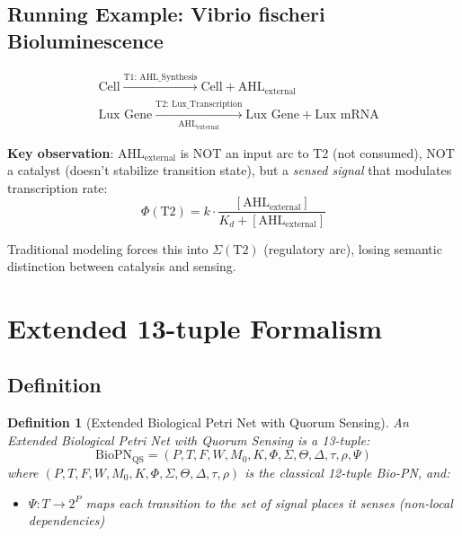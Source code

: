 \documentclass[11pt]{article}
\newtheorem{definition}{Definition}
\begin{document}
\subsection{Running Example: Vibrio fischeri Bioluminescence}

\begin{equation}
\begin{aligned}
&\text{Cell} \xrightarrow{\text{T1: AHL\_Synthesis}} \text{Cell} + \text{AHL}_{\text{external}} \\
&\text{Lux Gene} \xrightarrow[\text{AHL}_{\text{external}}]{\text{T2: Lux\_Transcription}} \text{Lux Gene} + \text{Lux mRNA}
\end{aligned}
\end{equation}

\textbf{Key observation}: $\text{AHL}_{\text{external}}$ is NOT an input arc to T2 (not consumed), NOT a catalyst (doesn't stabilize transition state), but a \emph{sensed signal} that modulates transcription rate:
\begin{equation}
\Phi(\text{T2}) = k \cdot \frac{[\text{AHL}_{\text{external}}]}{K_d + [\text{AHL}_{\text{external}}]}
\end{equation}

Traditional modeling forces this into $\Sigma(\text{T2})$ (regulatory arc), losing semantic distinction between catalysis and sensing.

\section{Extended 13-tuple Formalism}

\subsection{Definition}

\begin{definition}[Extended Biological Petri Net with Quorum Sensing]
An \emph{Extended Biological Petri Net with Quorum Sensing} is a 13-tuple:
\begin{equation}
\text{BioPN}_{\text{QS}} = (P, T, F, W, M_0, K, \Phi, \Sigma, \Theta, \Delta, \tau, \rho, \Psi)
\end{equation}
where $(P, T, F, W, M_0, K, \Phi, \Sigma, \Theta, \Delta, \tau, \rho)$ is the classical 12-tuple Bio-PN, and:
\begin{itemize}
    \item $\Psi: T \to 2^P$ maps each transition to the set of \emph{signal places} it senses (non-local dependencies)
\end{itemize}
\end{definition}
\end{document}
